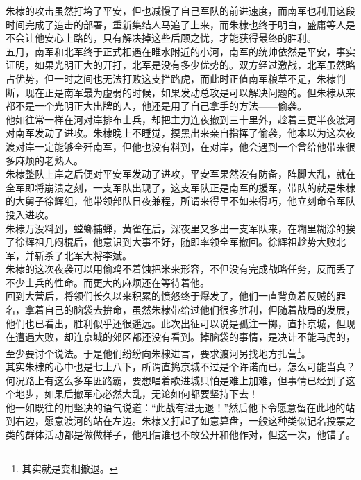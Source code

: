 \begin{multicols}{\theparacolNo}
朱棣的攻击虽然打垮了平安，但也减慢了自己军队的前进速度，而南军也利用这段时间完成了追击的部署，重新集结人马追了上来，而朱棣也终于明白，盛庸等人是不会让他安心上路的，只有解决掉这些后顾之忧，才能获得最终的胜利。\\

五月，南军和北军终于正式相遇在睢水附近的小河，南军的统帅依然是平安，事实证明，如果光明正大的开打，北军是没有多少优势的。双方经过激战，北军虽然略占优势，但一时之间也无法打败这支拦路虎，而此时正值南军粮草不足，朱棣判断，现在正是南军最为虚弱的时候，如果发动总攻是可以解决问题的。但朱棣从来都不是一个光明正大出牌的人，他还是用了自己拿手的方法——偷袭。\\

他如往常一样在河对岸排布士兵，却把主力连夜撤到三十里外，趁着三更半夜渡河对南军发动了进攻。朱棣晚上不睡觉，摸黑出来亲自指挥了偷袭，他本以为这次夜渡对岸一定能够全歼南军，但他也没有料到，在对岸，他会遇到一个曾给他带来很多麻烦的老熟人。\\

朱棣整队上岸之后便对平安军发动了进攻，平安军果然没有防备，阵脚大乱，就在全军即将崩溃之刻，一支军队出现了，这支军队正是南军的援军，带队的就是朱棣的大舅子徐辉组，他带领部队日夜兼程，所谓来得早不如来得巧，他立刻命令军队投入进攻。\\

朱棣万没料到，螳螂捕蝉，黄雀在后，深夜里又多出一支军队来，在糊里糊涂的挨了徐辉祖几闷棍后，他意识到大事不好，随即率领全军撤回。徐辉祖趁势大败北军，并斩杀了北军大将李斌。\\

朱棣的这次夜袭可以用偷鸡不着蚀把米来形容，不但没有完成战略任务，反而丢了不少士兵的性命。而更大的麻烦还在等待着他。\\

回到大营后，将领们长久以来积累的愤怒终于爆发了，他们一直背负着反贼的罪名，拿着自己的脑袋去拚命，虽然朱棣带给过他们很多胜利，但随着战局的发展，他们也已看出，胜利似乎还很遥远。此次出征可以说是孤注一掷，直扑京城，但现在遭遇大败，却连京城的郊区都还没有看到。掉脑袋的事情，是决计不能马虎的，至少要讨个说法。于是他们纷纷向朱棣进言，要求渡河另找地方扎营\footnote{其实就是变相撤退。}。\\

其实朱棣的心中也是七上八下，所谓直捣京城不过是个许诺而已，怎么可能当真？何况路上有这么多车匪路霸，要想唱着歌进城只怕是难上加难，但事情已经到了这个地步，如果后撤军心必然大乱，无论如何都要坚持下去！\\

他一如既往的用坚决的语气说道：“此战有进无退！”然后他下令愿意留在此地的站到右边，愿意渡河的站在左边。朱棣又打起了如意算盘，一般这种类似记名投票之类的群体活动都是做做样子，他相信谁也不敢公开和他作对，但这一次，他错了。\\


\end{multicols}
